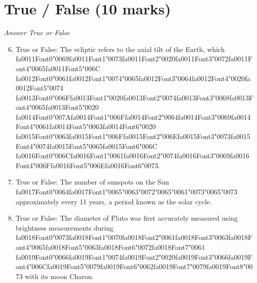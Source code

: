 \documentclass[12pt]{article}
\begin{document}
\section*{True / False (10 marks)}
\textit{Answer True or False}
\begin{enumerate}[label=\arabic*.]
\setcounter{enumi}{5}
\item True or False: The ecliptic refers to the axial tilt of the Earth, which {\csname fa0011Font0\endcsname\char"0069}{\csname fa0011Font1\endcsname\char"0073}{\csname fa0011Font2\endcsname\char"0020}{\csname fa0011Font3\endcsname\char"0072}{\csname fa0011Font4\endcsname\char"0065}{\csname fa0011Font5\endcsname\char"006C} {\csname fa0012Font0\endcsname\char"0061}{\csname fa0012Font1\endcsname\char"0074}{\char"0065}{\csname fa0012Font3\endcsname\char"0064}{\csname fa0012Font4\endcsname\char"0020}{\csname fa0012Font5\endcsname\char"0074} {\csname fa0013Font0\endcsname\char"006F}{\csname fa0013Font1\endcsname\char"0020}{\csname fa0013Font2\endcsname\char"0074}{\csname fa0013Font3\endcsname\char"0068}{\csname fa0013Font4\endcsname\char"0065}{\csname fa0013Font5\endcsname\char"0020} {\csname fa0014Font0\endcsname\char"007A}{\csname fa0014Font1\endcsname\char"006F}{\csname fa0014Font2\endcsname\char"0064}{\csname fa0014Font3\endcsname\char"0069}{\csname fa0014Font4\endcsname\char"0061}{\csname fa0014Font5\endcsname\char"0063}{\csname fa0014Font6\endcsname\char"0020} {\csname fa0015Font0\endcsname\char"0063}{\csname fa0015Font1\endcsname\char"006F}{\csname fa0015Font2\endcsname\char"006E}{\csname fa0015Font3\endcsname\char"0073}{\csname fa0015Font4\endcsname\char"0074}{\csname fa0015Font5\endcsname\char"0065}{\csname fa0015Font6\endcsname\char"006C} {\csname fa0016Font0\endcsname\char"006C}{\csname fa0016Font1\endcsname\char"0061}{\csname fa0016Font2\endcsname\char"0074}{\csname fa0016Font3\endcsname\char"0069}{\csname fa0016Font4\endcsname\char"006F}{\csname fa0016Font5\endcsname\char"006E}{\csname fa0016Font6\endcsname\char"0073}.
\item True or False: The number of sunspots on the Sun {\csname fa0017Font0\endcsname\char"0064}{\csname fa0017Font1\endcsname\char"0065}{\char"0063}{\char"0072}{\char"0065}{\char"0061}{\char"0073}{\char"0065}{\char"0073} approximately every 11 years, a period known as the solar cycle.
\item True or False: The diameter of Pluto was first accurately measured using brightness measurements during {\csname fa0018Font0\endcsname\char"0073}{\csname fa0018Font1\endcsname\char"0070}{\csname fa0018Font2\endcsname\char"0061}{\csname fa0018Font3\endcsname\char"0063}{\csname fa0018Font4\endcsname\char"0065}{\csname fa0018Font5\endcsname\char"0063}{\csname fa0018Font6\endcsname\char"0072}{\csname fa0018Font7\endcsname\char"0061} {\csname fa0019Font0\endcsname\char"0066}{\csname fa0019Font1\endcsname\char"0074}{\csname fa0019Font2\endcsname\char"0020}{\csname fa0019Font3\endcsname\char"0066}{\csname fa0019Font4\endcsname\char"006C}{\csname fa0019Font5\endcsname\char"0079}{\csname fa0019Font6\endcsname\char"0062}{\csname fa0019Font7\endcsname\char"0079}{\csname fa0019Font8\endcsname\char"0073} with its moon Charon.

\end{enumerate}
\end{document}
